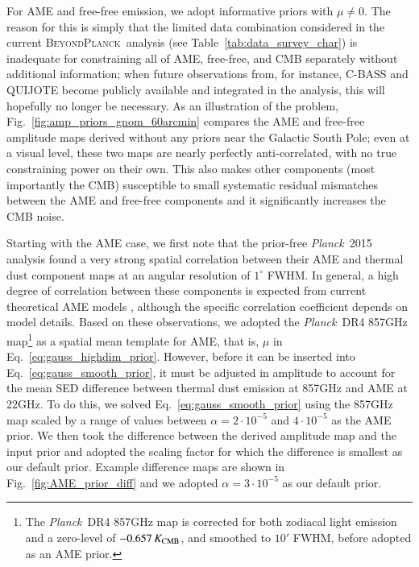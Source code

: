 \documentclass{aa}
\def\Planck{\textit{Planck}}
\def\,{\thinspace}
\newcommand{\BP}{\textsc{BeyondPlanck}}
\begin{document}
For AME and free-free emission, we adopt informative priors with $\mu
\ne 0$. The reason for this is simply that the limited data
combination considered in the current \BP\ analysis (see
Table~\ref{tab:data_survey_char}) is inadequate for constraining all
of AME, free-free, and CMB separately without additional information;
when future observations from, for instance, C-BASS \citep{king2010} and
QUIJOTE \citep{QUIJOTE_I_2015} become publicly available and
integrated in the analysis, this will hopefully no longer be
necessary. As an illustration of the problem,
Fig.~\ref{fig:amp_priors_gnom_60arcmin} compares the AME and free-free
amplitude maps derived without any priors near the Galactic South
Pole; even at a visual level, these two maps are nearly perfectly
anti-correlated, with no true constraining power on their own. This
also makes other components (most importantly the CMB) susceptible to
small systematic residual mismatches between the AME and free-free
components and it significantly increases the CMB noise.

Starting with the AME case, we first note that the prior-free
\Planck\ 2015 analysis \citep{planck2014-a12} found a very strong
spatial correlation between their AME and thermal dust component maps at an
angular resolution of $1^\circ$ FWHM. In general, a high degree of
correlation between these components is expected from current
theoretical AME models
\citep[e.g.,][]{erickson:1957,draine:1998,ali-haimoud:2010,
  silsbee:2011,Hensley2020}, although the specific correlation
coefficient depends on model details. Based on these observations, we
adopted the \Planck\ DR4 857\,GHz map\footnote{The \Planck\ DR4 857\,GHz
  map is corrected for both zodiacal light emission and a zero-level
  of $-0.657\,K_{\mathrm{CMB}}$, and smoothed to $10'$ FWHM, before
  adopted as an AME prior.} \citep{npipe} as a spatial mean template
for AME, that is, $\mu$ in Eq.~\eqref{eq:gauss_highdim_prior}.
However, before it can be inserted into
Eq.~\eqref{eq:gauss_smooth_prior}, it must be adjusted in amplitude to
account for the mean SED difference between thermal dust emission at
857\,GHz and AME at 22\,GHz. To do this, we solved
Eq.~\eqref{eq:gauss_smooth_prior} using the 857\,GHz map scaled by a
range of values between $\alpha=2\cdot10^{-5}$ and $4\cdot10^{-5}$ as
the AME prior. We then took the difference between the derived
amplitude map and the input prior and adopted the scaling factor for
which the difference is smallest as our default prior. Example
difference maps are shown in Fig.~\ref{fig:AME_prior_diff} and we
adopted $\alpha = 3\cdot10^{-5}$ as our default prior.
\end{document}
